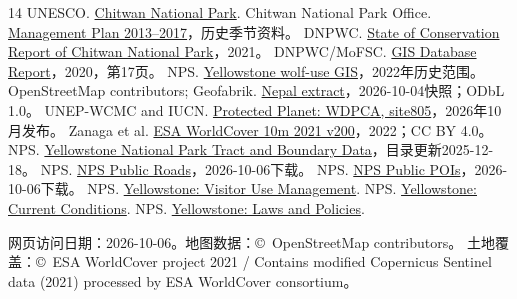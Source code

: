 \documentclass[UTF8,fontset=fandol,12pt,a4paper]{ctexart}
\begin{document}
\FloatBarrier
\begingroup\small
\begin{thebibliography}{14}
\setlength{\itemsep}{1pt}\setlength{\parskip}{0pt}
 UNESCO. \href{https://whc.unesco.org/en/list/284}{Chitwan National Park}.
 Chitwan National Park Office. \href{https://faolex.fao.org/docs/pdf/nep220147.pdf}{Management Plan 2013--2017}，历史季节资料。
 DNPWC. \href{https://dnpwc.gov.np/media/files/UNESCO_Report_of_Chitwan_National_Park.pdf}{State of Conservation Report of Chitwan National Park}，2021。
 DNPWC/MoFSC. \href{https://giwmscdntwo.gov.np/media/pages/files/Final\%20Report_GIS\%20Database_v4olikj.pdf}{GIS Database Report}，2020，第17页。
 NPS. \href{https://www.nps.gov/yell/learn/nature/upload/1995_2022-YELL-wolf-data.zip}{Yellowstone wolf-use GIS}，2022年历史范围。
 OpenStreetMap contributors; Geofabrik. \href{https://download.geofabrik.de/asia/nepal.html}{Nepal extract}，2026-10-04快照；ODbL 1.0。
 UNEP-WCMC and IUCN. \href{https://data-gis.unep-wcmc.org/server/rest/services/ProtectedPlanet/WDPCA/FeatureServer/1}{Protected Planet: WDPCA, site805}，2026年10月发布。
 Zanaga et al. \href{https://doi.org/10.5281/zenodo.7254221}{ESA WorldCover 10m 2021 v200}，2022；CC BY 4.0。
 NPS. \href{https://irma.nps.gov/DataStore/Reference/Profile/2316784}{Yellowstone National Park Tract and Boundary Data}，目录更新2025-12-18。
 NPS. \href{https://mapservices.nps.gov/arcgis/rest/services/NationalDatasets/NPS_Public_Roads/MapServer/0}{NPS Public Roads}，2026-10-06下载。
 NPS. \href{https://mapservices.nps.gov/arcgis/rest/services/NationalDatasets/NPS_Public_POIs_Geographic/FeatureServer/0}{NPS Public POIs}，2026-10-06下载。
 NPS. \href{https://www.nps.gov/yell/learn/management/visitor-use.htm}{Yellowstone: Visitor Use Management}.
 NPS. \href{https://www.nps.gov/yell/planyourvisit/conditions.htm}{Yellowstone: Current Conditions}.
 NPS. \href{https://www.nps.gov/yell/learn/management/lawsandpolicies.htm}{Yellowstone: Laws and Policies}.
\end{thebibliography}
网页访问日期：2026-10-06。地图数据：\copyright\ OpenStreetMap contributors。
土地覆盖：\copyright\ ESA WorldCover project 2021 / Contains modified Copernicus Sentinel data (2021) processed by ESA WorldCover consortium。
\endgroup
\end{document}

